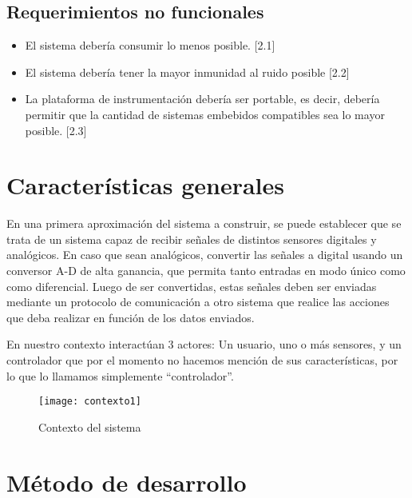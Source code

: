 
\subsection{Requerimientos no funcionales} %
\label{sub:requerimientos_no_funcionales}

\begin{itemize}
    \item El sistema debería consumir lo menos posible. [2.1]
    \item El sistema debería tener la mayor inmunidad al ruido posible [2.2]
	\item La plataforma de instrumentación debería ser portable, es decir, debería permitir que la cantidad de sistemas embebidos compatibles sea lo mayor posible. [2.3]
\end{itemize}



\section{Características generales} %
\label{sec:caracteristicas_generales}

En una primera aproximación del sistema a construir, se puede establecer que se trata de un sistema capaz de recibir señales de distintos sensores digitales y analógicos. En caso que sean analógicos, convertir las señales a digital usando un conversor A-D de alta ganancia, que permita tanto entradas en modo único como como diferencial. Luego de ser convertidas, estas señales deben ser enviadas mediante un protocolo de comunicación a otro sistema que realice las acciones que deba realizar en función de los datos enviados.

En nuestro contexto interactúan 3 actores: Un usuario, uno o más sensores, y un controlador que por el momento no hacemos mención de sus características, por lo que lo llamamos simplemente ``controlador''.

\begin{figure}[h]
  \centering
  \texttt{[image: contexto1]}
  \caption{Contexto del sistema}\label{fig:contexto1}
\end{figure}


\section{Método de desarrollo} %
\label{sec:metodo_de_desarrollo}

